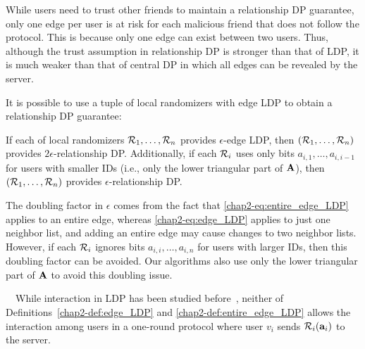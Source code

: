 While users need to trust other 
friends 
to maintain a relationship
DP guarantee, only one edge per user is at risk for each malicious 
friend 
that
does not follow the protocol. This is
because only one edge can exist between two users.  
Thus, although the trust assumption in relationship DP is stronger than that of LDP, it is much weaker than that of central DP in which all edges can be revealed by the server. 


It is possible to use
a tuple of local randomizers with edge LDP to obtain a relationship DP guarantee:
\begin{proposition}  
\label{chap2-prop:edge_LDP_entire_edge_LDP} 
  If 
  each 
  of local randomizers $\mathcal{R}_1, \ldots, \mathcal{R}_n$ 
  provides 
  $\epsilon$-edge LDP, then $(\mathcal{R}_1, \ldots, \mathcal{R}_n)$ provides 
  $2\epsilon$-relationship DP. 
  Additionally, if each $\mathcal{R}_i$ uses only bits $a_{i,1}, \ldots, a_{i,i-1}$ for users with smaller IDs (i.e., only the lower triangular part of $\mathbf{A}$), then $(\mathcal{R}_1, \ldots, \mathcal{R}_n)$ provides 
  $\epsilon$-relationship DP. 
\end{proposition}
The doubling factor in $\epsilon$ comes from the fact that 
\eqref{chap2-eq:entire_edge_LDP} applies to an entire edge, whereas
\eqref{chap2-eq:edge_LDP} applies to just one neighbor list, 
and 
adding an entire
edge may cause changes to two neighbor lists. 
However, 
if 
each $\mathcal{R}_i$ ignores
bits $a_{i,i}, \ldots, a_{i,n}$ for users with larger IDs, 
then this doubling
factor can be avoided. 
Our algorithms also use only the lower triangular part of $\mathbf{A}$ to avoid this doubling issue.

\smallskip
{}~~While interaction in LDP has been studied before~\cite{Joseph_SODA20}, neither of Definitions~\ref{chap2-def:edge_LDP} and \ref{chap2-def:entire_edge_LDP} 
allows the interaction among users in a one-round protocol where 
user $v_i$ sends $\mathcal{R}_i(\mathbf{a}_i)$ to the server. 

